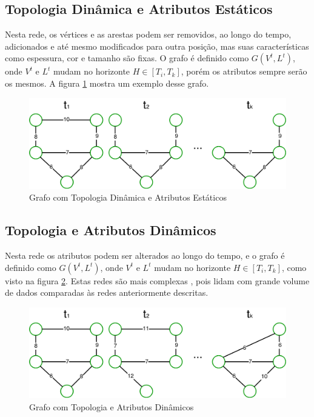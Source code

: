 \FloatBarrier

\subsection{Topologia Dinâmica e Atributos Estáticos}
\label{subsec:topdinatribest}
Nesta rede, os vértices e as arestas podem ser removidos, ao longo do tempo, adicionados e até mesmo
modificados para outra posição, mas suas características como espessura, cor e tamanho são fixas.
O grafo é definido como $G(V^t, L^t)$, onde $V^t$ e $L^t$ mudam no horizonte $H \in [T_i, T_k]$,
porém os atributos sempre serão os mesmos. A figura \ref{fig:tdae} mostra um exemplo desse grafo.

\begin{figure}[htbp]
\centering
 \includegraphics[width=.80\textwidth]{figuras/tdae.png}
\caption{Grafo com Topologia Dinâmica e Atributos Estáticos}
\label{fig:tdae}
\end{figure}

\FloatBarrier

\subsection{Topologia e Atributos Dinâmicos}
\label{subsec:topdinatridin}
Nesta rede os atributos podem ser alterados ao longo do tempo, e o grafo é definido como $G(V^t, L^t)$,
onde $V^t$ e $L^t$ mudam no horizonte $H \in [T_i, T_k]$, como visto na figura \ref{fig:tdad}.
Estas redes são mais complexas \cite{dynagraph}, pois lidam com grande volume de dados comparadas às redes anteriormente descritas.

\begin{figure}[htbp]
\centering
 \includegraphics[width=.80\textwidth]{figuras/tdad.png}
\caption{Grafo com Topologia e Atributos Dinâmicos}
\label{fig:tdad}
\end{figure}




